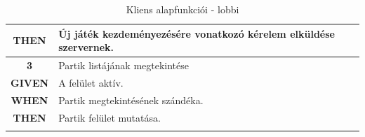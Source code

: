 \documentclass[twoside, a4paper, 12pt]{article}
\begin{document}
\begin{longtable}[c]{|c|p{14cm}|}
	\textbf{THEN} &
	Új játék kezdeményezésére vonatkozó kérelem elküldése szervernek.
	\\
	\hline
	
	\rowcolor[HTML]{CBCEFB} 
	\textbf{3}
	&	Partik listájának megtekintése
	\\ \nobreakhline
	
	\textbf{GIVEN} &
	A felület aktív.
	\\ \nobreakhline
	
	\textbf{WHEN} &
	Partik megtekintésének szándéka.
	\\
	\nobreakhline
	
	\textbf{THEN} &
	Partik felület mutatása.
	\\
	\hline
	\caption{Kliens alapfunkciói - lobbi}
	\label{userStories:client:lobby}\\
\end{longtable}
\end{document}
